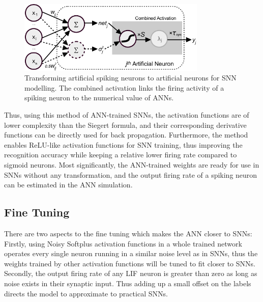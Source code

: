 \documentclass[runningheads,a4paper]{llncs}
\begin{document}
\begin{figure}[tbh!]
	\centering
	\includegraphics[width=0.8\textwidth]{neuron_t.pdf}
	\caption{Transforming artificial spiking neurons to artificial neurons for SNN modelling. The combined activation links the firing activity of a spiking neuron to the numerical value of ANNs.}
	\label{Fig:tneuron}
\end{figure}







Thus, using this method of ANN-trained SNNs, the activation functions are of lower complexity than the Siegert formula, and their corresponding derivative functions can be directly used for back propagation.
Furthermore, the method enables ReLU-like activation functions for SNN training, thus improving the recognition accuracy while keeping a relative lower firing rate compared to sigmoid neurons. 
Most significantly, the ANN-trained weights are ready for use in SNNs without any transformation, and the output firing rate of a spiking neuron can be estimated in the ANN simulation.


\subsection{Fine Tuning}
There are two aspects to the fine tuning which makes the ANN closer to SNNs:
Firstly, using Noisy Softplus activation functions in a whole trained network operates every single neuron running in a similar noise level as in SNNs, thus the weights trained by other activation functions will be tuned to fit closer to SNNs.
Secondly, the output firing rate of any LIF neuron is greater than zero as long as noise exists in their synaptic input.
Thus adding up a small offset on the labels directs the model to approximate to practical SNNs. 
\end{document}

